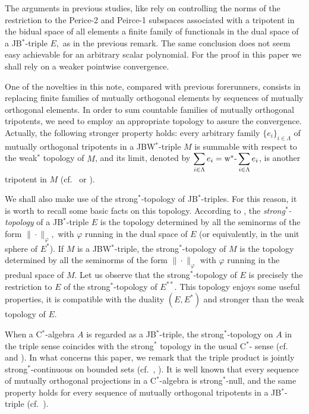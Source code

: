 \documentclass[10pt]{amsart}
\begin{document}
The arguments in previous studies, like \cite{MarOikh2004,Santos2014} rely on controlling the norms of the restriction to the Perice-2 and Peirce-1 subspaces associated with a tripotent in the bidual space of all elements a finite family of functionals in the dual space of a JB$^*$-triple $E,$ as in the previous remark. The same conclusion does not seem easy achievable for an arbitrary scalar polynomial. For the proof in this paper we shall rely on a weaker pointwise convergence.

One of the novelties in this note, compared with previous forerunners,  consists in replacing finite families of mutually orthogonal elements by sequences of mutually orthogonal elements. In order to sum countable families of mutually orthogonal tripotents, we need to employ an appropriate topology to assure the convergence. Actually, the following stronger property holds: every arbitrary family $\{e_i\}_{i\in \Lambda}$ of mutually orthogonal tripotents in a JBW$^*$-triple $M$ is summable with respect to the weak$^*$ topology of $M$, and its limit, denoted by $\displaystyle \sum_{i\in \Lambda} e_i = \hbox{w$^*$-}\sum_{i\in \Lambda} e_i$, is another tripotent in $M$ (cf.\ \cite[Corollary 3.13]{Horn87} or \cite[Proposition 3.8]{Batt91}).
	
	We shall also make use of the strong$^*$-topology of JB$^*$-triples. For this reason, it is worth to recall some basic facts on this topology. According to \cite[\S 3]{BarFri90}, the \emph{strong$^*$-topology} of a JB$^*$-triple $E$ is the topology determined by all the seminorms of the form $\|\cdot\|_{\varphi},$ with $\varphi$ running in the dual space of $E$ (or equivalently, in the unit sphere of $E^*$). If $M$ is a JBW$^*$-triple, the strong$^*$-topology of $M$ is the topology determined by all the seminorms of the form $\|\cdot\|_{\varphi}$ with $\varphi$ running in the predual space of $M$. Let us observe that the strong$^*$-topology of $E$ is precisely the restriction to $E$ of the strong$^*$-topology of $E^{**}$. This topology enjoys some useful properties, it is compatible with the duality $(E,E^*)$ and stronger than the weak topology of $E$.
	
	When a C$^*$-algebra $A$ is regarded as a JB$^*$-triple, the strong$^*$-topology on $A$ in the triple sense coincides with the strong$^*$ topology in the usual C$^*$- sense (cf.\ \cite[1.8.7]{Sak} and  \cite[p.\ 258-259]{BarFri90}). In what concerns this paper, we remark that the triple product is jointly strong$^*$-continuous on bounded sets (cf.\ \cite{Rod89}, \cite[\S 4]{PeRo01}). It is well known that every sequence of mutually orthogonal projections in a C$^*$-algebra is strong$^*$-null, and the same property holds for every sequence of mutually orthogonal tripotents in a JB$^*$-triple (cf.\ \cite[Comments in page 86]{PePfi15}).\label{eq orthogonal sequences are strong* null}
		
\end{document}
